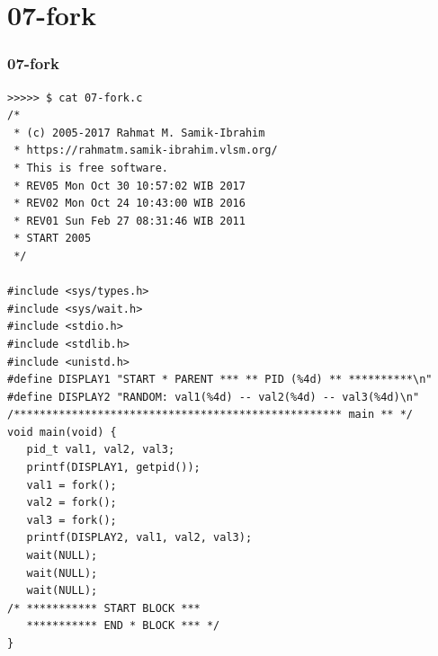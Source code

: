 \documentclass[xcolor=table, notheorems, hyperref={pdfpagelabels=false}]{beamer}
\begin{document}
\section{07-fork}
\begin{frame}[fragile]
\frametitle{07-fork}
\begin{lstlisting}[basicstyle=\ttfamily\tiny]
>>>>> $ cat 07-fork.c 
/*
 * (c) 2005-2017 Rahmat M. Samik-Ibrahim
 * https://rahmatm.samik-ibrahim.vlsm.org/
 * This is free software.
 * REV05 Mon Oct 30 10:57:02 WIB 2017
 * REV02 Mon Oct 24 10:43:00 WIB 2016
 * REV01 Sun Feb 27 08:31:46 WIB 2011
 * START 2005
 */

#include <sys/types.h>
#include <sys/wait.h>
#include <stdio.h>
#include <stdlib.h>
#include <unistd.h>
#define DISPLAY1 "START * PARENT *** ** PID (%4d) ** **********\n"
#define DISPLAY2 "RANDOM: val1(%4d) -- val2(%4d) -- val3(%4d)\n"
/*************************************************** main ** */
void main(void) {
   pid_t val1, val2, val3;
   printf(DISPLAY1, getpid());
   val1 = fork();
   val2 = fork();
   val3 = fork();
   printf(DISPLAY2, val1, val2, val3);
   wait(NULL);
   wait(NULL);
   wait(NULL);
/* *********** START BLOCK ***
   *********** END * BLOCK *** */
}

\end{lstlisting}
\end{frame}
\end{document}
